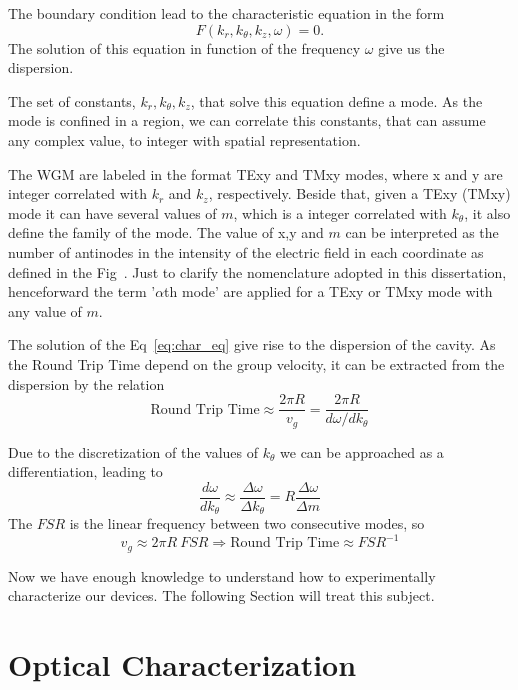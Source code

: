 The boundary condition lead to the characteristic equation in the form 
\begin{equation}
    F(k_r,k_\theta,k_z,\omega) = 0.
    \label{eq:char_eq}
\end{equation}
The solution of this equation in function of the frequency $\omega$ give us the dispersion. 

The set of constants, $k_r,k_\theta,k_z$, that solve this equation define a mode. As the mode is confined in a region, we can correlate this constants, that can assume any complex value, to integer with spatial representation.

The WGM are labeled in the format TExy and TMxy modes, where x and y are integer correlated with $k_r$ and $k_z$, respectively. Beside that, given a TExy (TMxy) mode it can have several values of $m$, which is a integer correlated with $k_\theta$, it also define the family of the mode. The value of x,y and $m$ can be interpreted as the number of antinodes in the intensity of the electric field in each coordinate as defined in the Fig~. Just to clarify the nomenclature adopted in this dissertation, henceforward the term '$\alpha$th mode' are applied for a TExy or TMxy mode with any value of $m$. 

The solution of the Eq~\ref{eq:char_eq} give rise to the dispersion of the cavity. As the Round Trip Time depend on the group velocity, it can be extracted from the dispersion by the relation
\begin{equation}
    \text{Round Trip Time} \approx \frac{2\pi R}{v_g} = \frac{2\pi R}{d\omega/dk_\theta} 
\end{equation}

Due to the discretization of the values of $k_\theta$ we can be approached as a differentiation, leading to
\begin{equation}
    \frac{d\omega}{dk_\theta} \approx \frac{\Delta \omega}{\Delta k_\theta} = R\frac{\Delta \omega}{\Delta m}
\end{equation}
The $FSR$ is the linear frequency between two consecutive modes, so
\begin{equation}
    v_g \approx 2\pi R~FSR \Rightarrow \text{Round Trip Time} \approx FSR^{-1} 
\end{equation}

Now we have enough knowledge to understand how to experimentally characterize our devices. The following Section will treat this subject. 

\section{Optical Characterization}
\label{sec:optical_char}

